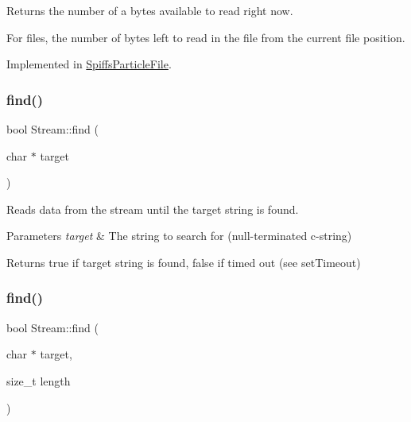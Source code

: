 Returns the number of a bytes available to read right now. 

For files, the number of bytes left to read in the file from the current file position. 

Implemented in \mbox{\hyperlink{class_spiffs_particle_file_a0f1c61016a86835e325bf231d90f9fbf}{Spiffs\+Particle\+File}}.

\mbox{\label{class_stream_a4bab30ccd324efd461dee46a2339f673}} 
\subsubsection{\texorpdfstring{find()}{find()}\hspace{0.1cm}{\footnotesize\ttfamily [1/2]}}
{\footnotesize\ttfamily bool Stream\+::find (\begin{DoxyParamCaption}\item[{char $\ast$}]{target }\end{DoxyParamCaption})}



Reads data from the stream until the target string is found. 


\begin{DoxyParams}{Parameters}
{\em target} & The string to search for (null-\/terminated c-\/string)\\
\hline
\end{DoxyParams}
\begin{DoxyReturn}{Returns}
true if target string is found, false if timed out (see set\+Timeout) 
\end{DoxyReturn}
\mbox{\label{class_stream_ad851401f2318cdb1de05707e021b81d9}} 
\subsubsection{\texorpdfstring{find()}{find()}\hspace{0.1cm}{\footnotesize\ttfamily [2/2]}}
{\footnotesize\ttfamily bool Stream\+::find (\begin{DoxyParamCaption}\item[{char $\ast$}]{target,  }\item[{size\+\_\+t}]{length }\end{DoxyParamCaption})}




